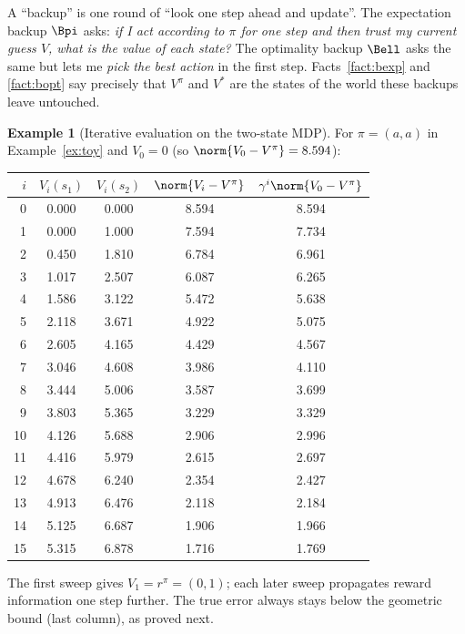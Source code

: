 \documentclass[11pt,a4paper]{article}
\theoremstyle{plain}
\theoremstyle{definition}
\newtheorem{example}[theorem]{Example}
\theoremstyle{remark}
\begin{document}
\begin{intuition}
A ``backup'' is one round of ``look one step ahead and update''. The expectation backup $\Bpi$ asks: \emph{if I act according to $\pi$ for one step and then trust my current guess $V$, what is the value of each state?} The optimality backup $\Bell$ asks the same but lets me \emph{pick the best action} in the first step. Facts~\ref{fact:bexp} and \ref{fact:bopt} say precisely that $V^\pi$ and $V^*$ are the states of the world these backups leave untouched.
\end{intuition}

\begin{example}[Iterative evaluation on the two-state MDP]\label{ex:pe}
For $\pi=(a,a)$ in Example~\ref{ex:toy} and $V_0=0$ (so $\norm{V_0-V^\pi}=8.594$):
\begin{center}
\begin{tabular}{@{}rcccc@{}}
\toprule
$i$ & $V_i(s_1)$ & $V_i(s_2)$ & $\norm{V_i-V^\pi}$ & $\gamma^i\norm{V_0-V^\pi}$\\
\midrule
0 & 0.000 & 0.000 & 8.594 & 8.594 \\
1 & 0.000 & 1.000 & 7.594 & 7.734 \\
2 & 0.450 & 1.810 & 6.784 & 6.961 \\
3 & 1.017 & 2.507 & 6.087 & 6.265 \\
4 & 1.586 & 3.122 & 5.472 & 5.638 \\
5 & 2.118 & 3.671 & 4.922 & 5.075 \\
6 & 2.605 & 4.165 & 4.429 & 4.567 \\
7 & 3.046 & 4.608 & 3.986 & 4.110 \\
8 & 3.444 & 5.006 & 3.587 & 3.699 \\
9 & 3.803 & 5.365 & 3.229 & 3.329 \\
10 & 4.126 & 5.688 & 2.906 & 2.996 \\
11 & 4.416 & 5.979 & 2.615 & 2.697 \\
12 & 4.678 & 6.240 & 2.354 & 2.427 \\
13 & 4.913 & 6.476 & 2.118 & 2.184 \\
14 & 5.125 & 6.687 & 1.906 & 1.966 \\
15 & 5.315 & 6.878 & 1.716 & 1.769 \\
\bottomrule
\end{tabular}
\end{center}
The first sweep gives $V_1=r^\pi=(0,1)$; each later sweep propagates reward information one step further. The true error always stays below the geometric bound (last column), as proved next.
\end{example}
\end{document}
